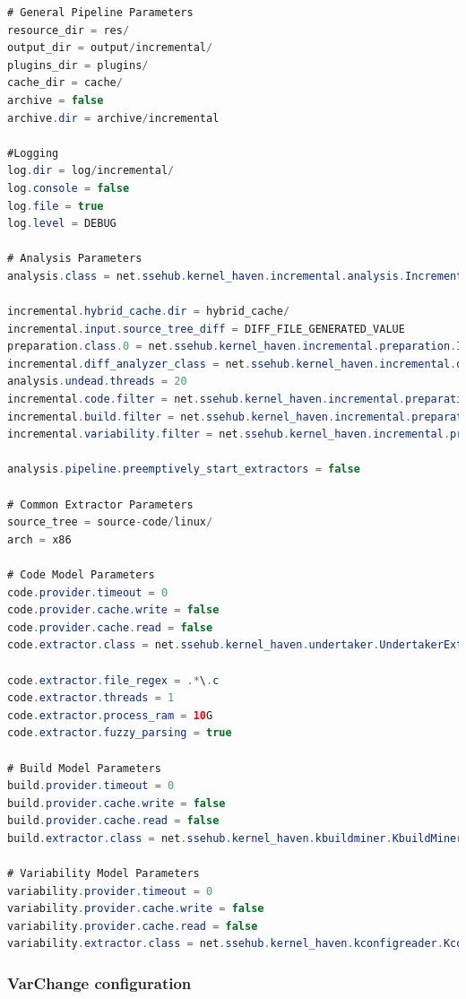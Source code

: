\documentclass[a4paper]{article}
\begin{document}
\begin{lstlisting}[language=java]
# General Pipeline Parameters 
resource_dir = res/
output_dir = output/incremental/
plugins_dir = plugins/
cache_dir = cache/
archive = false
archive.dir = archive/incremental

#Logging
log.dir = log/incremental/
log.console = false
log.file = true
log.level = DEBUG

# Analysis Parameters
analysis.class = net.ssehub.kernel_haven.incremental.analysis.IncrementalThreadedDeadCodeAnalysis

incremental.hybrid_cache.dir = hybrid_cache/
incremental.input.source_tree_diff = DIFF_FILE_GENERATED_VALUE
preparation.class.0 = net.ssehub.kernel_haven.incremental.preparation.IncrementalPreparation
incremental.diff_analyzer_class = net.ssehub.kernel_haven.incremental.diff.analyzer.SimpleDiffAnalyzer
analysis.undead.threads = 20
incremental.code.filter = net.ssehub.kernel_haven.incremental.preparation.filter.ChangeFilter
incremental.build.filter = net.ssehub.kernel_haven.incremental.preparation.filter.ChangeFilter
incremental.variability.filter = net.ssehub.kernel_haven.incremental.preparation.filter.ChangeFilter

analysis.pipeline.preemptively_start_extractors = false

# Common Extractor Parameters
source_tree = source-code/linux/
arch = x86

# Code Model Parameters
code.provider.timeout = 0
code.provider.cache.write = false
code.provider.cache.read = false
code.extractor.class = net.ssehub.kernel_haven.undertaker.UndertakerExtractor

code.extractor.file_regex = .*\.c
code.extractor.threads = 1
code.extractor.process_ram = 10G
code.extractor.fuzzy_parsing = true

# Build Model Parameters 
build.provider.timeout = 0
build.provider.cache.write = false
build.provider.cache.read = false
build.extractor.class = net.ssehub.kernel_haven.kbuildminer.KbuildMinerExtractor

# Variability Model Parameters
variability.provider.timeout = 0
variability.provider.cache.write = false
variability.provider.cache.read = false
variability.extractor.class = net.ssehub.kernel_haven.kconfigreader.KconfigReaderExtractor
\end{lstlisting}

\subsubsection{VarChange configuration}
\end{document}
